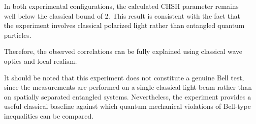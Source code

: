 \documentclass[17pt,a4paper]{extarticle}
\begin{document}
In both experimental configurations, the calculated CHSH parameter remains well below the classical bound of $2$. This result is consistent with the fact that the experiment involves classical polarized light rather than entangled quantum particles.

Therefore, the observed correlations can be fully explained using classical wave optics and local realism.

It should be noted that this experiment does not constitute a genuine Bell test, since the measurements are performed on a single classical light beam rather than on spatially separated entangled systems. Nevertheless, the experiment provides a useful classical baseline against which quantum mechanical violations of Bell-type inequalities can be compared.
\end{document}

